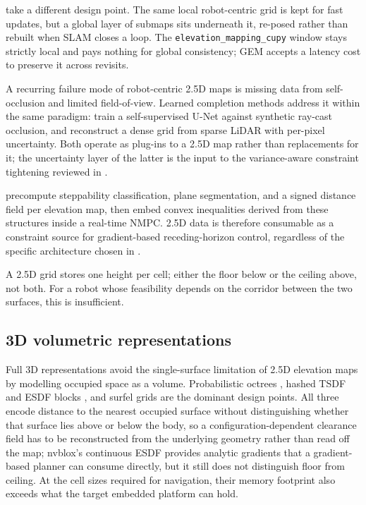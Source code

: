 \documentclass[11pt,a4paper]{article}
\begin{document}
\citet{GEMOnlineGlobally} take a different design point. The same local robot-centric grid is kept for fast updates, but a global layer of submaps sits underneath it, re-posed rather than rebuilt when SLAM closes a loop. The \texttt{elevation\_mapping\_cupy} window stays strictly local and pays nothing for global consistency; GEM accepts a latency cost to preserve it across revisits.

A recurring failure mode of robot-centric 2.5D maps is missing data from self-occlusion and limited field-of-view. Learned completion methods address it within the same paradigm: \citet{stolzleReconstructingOccludedElevation2021} train a self-supervised U-Net against synthetic ray-cast occlusion, and \citet{yangRealtimeNeuralDense2023} reconstruct a dense grid from sparse LiDAR with per-pixel uncertainty. Both operate as plug-ins to a 2.5D map rather than replacements for it; the uncertainty layer of the latter is the input to the variance-aware constraint tightening reviewed in
.

\citet{grandiaPerceptiveLocomotionNonlinear2022} precompute steppability classification, plane segmentation, and a signed distance field per elevation map, then embed convex inequalities derived from these structures inside a real-time NMPC. 2.5D data is therefore consumable as a constraint source for gradient-based receding-horizon control, regardless of the specific architecture chosen in .

A 2.5D grid stores one height per cell; either the floor below or the ceiling above, not both. For a robot whose feasibility depends on the corridor between the two surfaces, this is insufficient.

\subsection{3D volumetric representations}
\label{sec:sq1:volumetric}

Full 3D representations avoid the single-surface limitation of 2.5D elevation maps by modelling occupied space as a volume. Probabilistic octrees \citep{OctoMapEfficientProbabilistic}, hashed TSDF and ESDF blocks \citep{millaneNvbloxGPUAcceleratedIncremental2024}, and surfel grids \citep{droeschelContinuousMappingLocalization2017} are the dominant design points. All three encode distance to the nearest occupied surface without distinguishing whether that surface lies above or below the body, so a configuration-dependent clearance field has to be reconstructed from the underlying geometry rather than read off the map; nvblox's continuous ESDF provides analytic gradients that a gradient-based planner can consume directly, but it still does not distinguish floor from ceiling. At the cell sizes required for navigation, their memory footprint also exceeds what the target embedded platform can hold.
\end{document}
